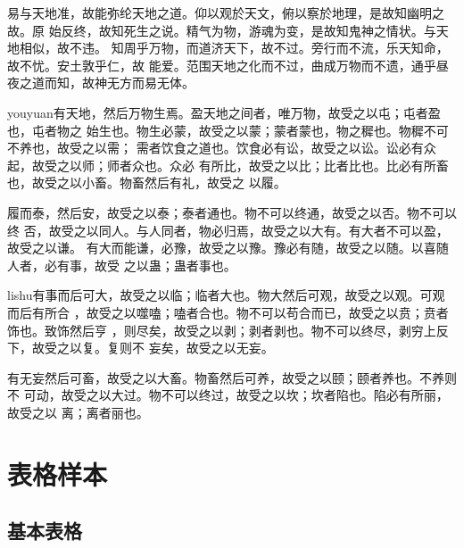{\fangsong 易与天地准，故能弥纶天地之道。仰以观於天文，俯以察於地理，是故知幽明之故。原
  始反终，故知死生之说。精气为物，游魂为变，是故知鬼神之情状。与天地相似，故不违。
  知周乎万物，而道济天下，故不过。旁行而不流，乐天知命，故不忧。安土敦乎仁，故
  能爱。范围天地之化而不过，曲成万物而不遗，通乎昼夜之道而知，故神无方而易无体。}

{\ifcsname youyuan\endcsname\youyuan 有天地，然后万物生焉。盈天地之间者，唯万物，故受之以屯；屯者盈也，屯者物之
  始生也。物生必蒙，故受之以蒙；蒙者蒙也，物之穉也。物穉不可不养也，故受之以需；
  需者饮食之道也。饮食必有讼，故受之以讼。讼必有众起，故受之以师；师者众也。众必
  有所比，故受之以比；比者比也。比必有所畜也，故受之以小畜。物畜然后有礼，故受之
  以履。\fi}

{\heiti 履而泰，然后安，故受之以泰；泰者通也。物不可以终通，故受之以否。物不可以终
  否，故受之以同人。与人同者，物必归焉，故受之以大有。有大者不可以盈，故受之以谦。
  有大而能谦，必豫，故受之以豫。豫必有随，故受之以随。以喜随人者，必有事，故受
  之以蛊；蛊者事也。}

{\ifcsname lishu\endcsname\lishu 有事而后可大，故受之以临；临者大也。物大然后可观，故受之以观。可观而后有所合
  ，故受之以噬嗑；嗑者合也。物不可以苟合而已，故受之以贲；贲者饰也。致饰然后亨
  ，则尽矣，故受之以剥；剥者剥也。物不可以终尽，剥穷上反下，故受之以复。复则不
  妄矣，故受之以无妄。\fi}

{\songti 有无妄然后可畜，故受之以大畜。物畜然后可养，故受之以颐；颐者养也。不养则不
  可动，故受之以大过。物不可以终过，故受之以坎；坎者陷也。陷必有所丽，故受之以
  离；离者丽也。}

\section{表格样本}
\label{chap1:sample:table} 

\subsection{基本表格}
\label{sec:basictable}


